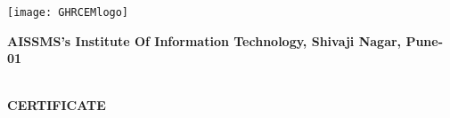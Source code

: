 \begin{titlepage}
{
	\def \person {his}
}
{
	{
		\def \person {his}
	}
	{
		{
			\def \person {his}
		}
		{
			{
				\def \person {his}
			}
			{
				\def \person {her}
			}
		}
	}
}


\thisfancypage{%
  \setlength{\fboxrule}{1pt}\doublebox}{}

\begin{center}
\begin{minipage}[c]{0.18\textwidth}
\texttt{[image: GHRCEMlogo]}%
\end{minipage}
\begin{minipage}[c]{0.80\textwidth}
\centering
\Large{\textbf{AISSMS's Institute Of Information Technology, Shivaji Nagar, Pune- 01 \mbox{} 
}}
\end{minipage}
 \mbox{} \\ \mbox{} %
\Large{\textbf{\uppercase{certificate}}}
 \mbox{} %
\end{center}
\begin{adjustwidth}{0.40in}{0.40in}


\end{adjustwidth}
\end{titlepage}
